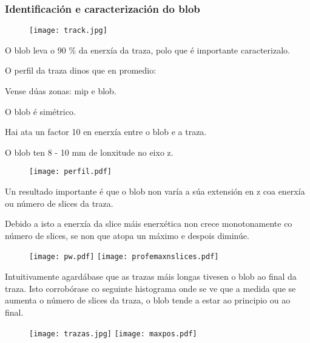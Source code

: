 \documentclass[10pt]{beamer}
\begin{document}
\begin{frame}[allowframebreaks]\frametitle{Identificación e caracterización do blob}

\begin{figure}
\centering
\texttt{[image: track.jpg]}
\end{figure}

\newpage

\bi \justifying
\item O blob leva o 90 \% da enerxía da traza, polo que é importante caracterizalo.

\item O perfil da traza dinos que en promedio:
	\bi \justifying
	\item Vense dúas zonas: mip e blob.
	\item O blob é simétrico.
	\item Hai ata un factor 10 en enerxía entre o blob e a traza.
	\item O blob ten 8 - 10 mm de lonxitude no eixo z.
	\ei
\ei

\vspace{-0.5cm}

\begin{figure}
\centering
\texttt{[image: perfil.pdf]}
\end{figure}

\bi \justifying

\item Un resultado importante é que o blob non varía a súa extensión en z coa enerxía ou número de slices da traza.
\bigskip
\item Debido a isto a enerxía da slice máis enerxética non crece monotonamente co número de slices, se non que atopa un máximo e despois diminúe.
\ei

\vspace{-0.5cm}

\begin{figure}
\centering
\texttt{[image: pw.pdf]}
\texttt{[image: profemaxnslices.pdf]}
\end{figure}
\newpage
\bi \justifying
\item Intuitivamente agardábase que as trazas máis longas tivesen o blob ao final da traza. Isto corrobórase co seguinte histograma onde se ve que a medida que se aumenta o número de slices da traza, o blob tende a estar ao principio ou ao final. 
\ei

\begin{figure}
\centering
\texttt{[image: trazas.jpg]}
\texttt{[image: maxpos.pdf]}
\end{figure}

\end{frame}
\end{document}
